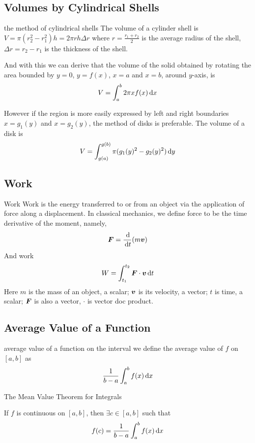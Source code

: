 \documentclass[Calculus 1 Recitation.tex]{subfiles}
\begin{document}
\subsection{Volumes by Cylindrical Shells}
\begin{myleftlinebox}
	the method of cylindrical shells
	\tcblower
	The volume of a cylinder shell is $V=\pi(r_2^2-r_1^2)h=2\pi rh\Delta r$ where $r=\frac{r_1+r_2}{2}$ is the average radius of the shell, $\Delta r=r_2-r_1$ is the thickness of the shell.

	And with this we can derive that the volume of the solid obtained by rotating the area bounded by $y=0$, $y=f(x)$, $x=a$ and $x=b$, around $y$-axis, is
	\[V=\int_a^b 2\pi xf(x) \,\mathrm{d} x\]

	However if the region is more easily expressed by left and right boundaries $x=g_1(y)$ and $x=g_2(y)$, the method of disks is preferable. The volume of a disk is 
	\[V = \int_{g(a)}^{g(b)} \pi(g_1(y)^2-g_2(y)^2)\,\mathrm{d} y\]
\end{myleftlinebox}

\subsection{Work}
\begin{myleftlinebox}
	Work
	\tcblower
	Work is the energy transferred to or from an object via the application of force along a displacement.
	In classical mechanics, we define force to be the time derivative of the moment, namely,
	\[\boldsymbol{F} = \frac{\,\mathrm{d}}{\,\mathrm{d} t} (m\boldsymbol{v})\]
	And work
	\[W = \int_{t_1}^{t_2} \boldsymbol{F}\cdot \boldsymbol{v} \,\mathrm{d} t\]
	Here $m$ is the mass of an object, a scalar; $\boldsymbol{v}$ is its velocity, a vector; $t$ is time, a scalar; $\boldsymbol{F}$ is also a vector, $\cdot$ is vector doc product.
\end{myleftlinebox}

\subsection{Average Value of a Function}
\begin{myleftlinebox}
	average value of a function on the interval
	\tcblower
	we define the average value of $f$ on $[a,b]$ as
	\[\frac{1}{b-a}\int_a^b f(x)\,\mathrm{d} x\]
\end{myleftlinebox}

\begin{myleftlinebox}
	The Mean Value Theorem for Integrals
	\tcblower
	\begin{theorem}
		If $f$ is continuous on $[a,b]$, then $\exists c\in[a,b]$ such that
		\[f(c) = \frac{1}{b-a}\int_a^b f(x)\,\mathrm{d} x\]
	\end{theorem}
\end{myleftlinebox}
\end{document}
